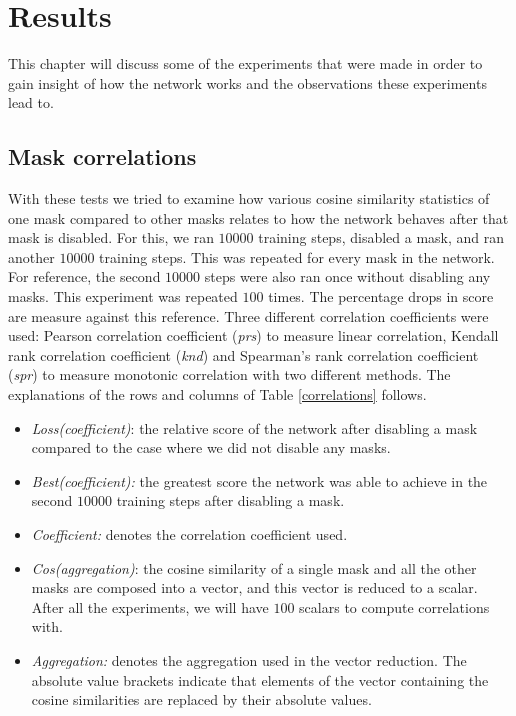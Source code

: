 \documentclass[12pt]{report}
\begin{document}
\chapter{Results}
This chapter will discuss some of the experiments that were made in order to gain insight of how the network works and the observations these experiments lead to.
\section{Mask correlations}
With these tests we tried to examine how various cosine similarity statistics of one mask compared to other masks relates to how the network behaves after that mask is disabled. For this, we ran $10000$ training steps, disabled a mask, and ran another $10000$ training steps. This was repeated for every mask in the network. For reference, the second $10000$ steps were also ran once without disabling any masks. This experiment was repeated $100$ times. The percentage drops in score are measure against this reference. Three different correlation coefficients were used: Pearson correlation coefficient (\textit{prs}) \cite{prs} to measure linear correlation, Kendall rank correlation coefficient (\textit{knd}) \cite{knd} and Spearman's rank correlation coefficient (\textit{spr}) \cite{spr} to measure monotonic correlation with two different methods. The explanations of the rows and columns of Table \ref{correlations} follows.
\begin{itemize}
	\item \textit{Loss(coefficient)}: the relative score of the network after disabling a mask compared to the case where we did not disable any masks.
	
	\item\textit{Best(coefficient):} the greatest score the network was able to achieve in the second $10000$ training steps after disabling a mask.
	
	\item\textit{Coefficient:} denotes the correlation coefficient used.
	
	\item\textit{Cos(aggregation)}: the cosine similarity of a single mask and all the other masks are composed into a vector, and this vector is reduced to a scalar. After all the experiments, we will have $100$ scalars to compute correlations with.
	
	\item\textit{Aggregation:} denotes the aggregation used in the vector reduction. The absolute value brackets indicate that elements of the vector containing the cosine similarities are replaced by their absolute values.
\end{itemize}
\end{document}
